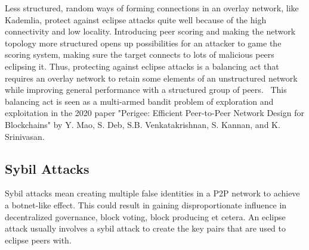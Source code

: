 Less structured, random ways of forming connections in an overlay network, like Kademlia, protect against eclipse attacks quite well because of the high connectivity and low locality. Introducing peer scoring and making the network topology more structured opens up possibilities for an attacker to game the scoring system, making sure the target connects to lots of malicious peers eclipsing it. Thus, protecting against eclipse attacks is a balancing act that requires an overlay network to retain some elements of an unstructured network while improving general performance with a structured group of peers.~\cite{Mao2020-ee} This balancing act is seen as a multi-armed bandit problem of exploration and exploitation in the 2020 paper "Perigee: Efficient Peer-to-Peer Network Design for Blockchains" by Y. Mao, S. Deb, S.B. Venkatakrishnan, S. Kannan, and K. Srinivasan.

\subsection{Sybil Attacks}
Sybil attacks mean creating multiple false identities in a P2P network to achieve a botnet-like effect. This could result in gaining disproportionate influence in decentralized governance, block voting, block producing et cetera. An eclipse attack usually involves a sybil attack to create the key pairs that are used to eclipse peers with.

